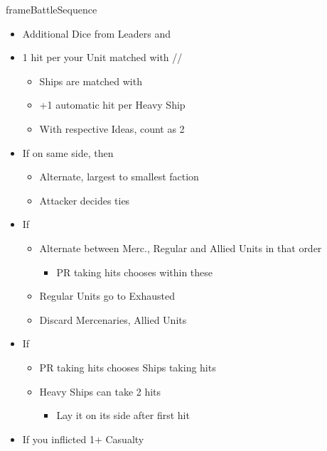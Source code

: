 \documentclass[10pt]{article}
\newlength{\fhBattleSequence} \setlength\fhBattleSequence{50\baselineskip}
\begin{document}
\begin{dynamiccontents*}{frameBattleSequence}
\begin{eubox}{\fhBattleSequence}
\begin{multicols}{2}
\begin{itemize}
			\item Additional Dice from Leaders and \battleactions
			\item 1 hit per your Unit matched with \infantry/\cavalry/\artillery
			\begin{itemize}
				\item Ships are matched with \artillery
				\item +1 automatic hit per Heavy Ship
				\item With respective Ideas, count \tercios as 2\infantry
			\end{itemize}
		\end{itemize}
		\begin{itemize}
			\item If  on same side, then
			\begin{itemize}
				\item Alternate, largest to smallest faction
				\item Attacker decides ties
			\end{itemize}
			\item If 
			\begin{itemize}
				\item Alternate between Merc., Regular and Allied Units in that order
				\begin{itemize}
					\item PR taking hits chooses within these
				\end{itemize}
				\item Regular Units go to Exhausted \manpower
				\item Discard Mercenaries, Allied Units
			\end{itemize}
			\item If 
			\begin{itemize}
				\item PR taking hits chooses Ships taking hits
				\item Heavy Ships can take 2 hits
				\begin{itemize}
					\item Lay it on its side after first hit
				\end{itemize}
			\end{itemize}
		\end{itemize}
		\begin{itemize}
			\item If you inflicted 1+ Casualty

\end{itemize}
\end{multicols}
\end{eubox}
\end{dynamiccontents*}
\end{document}
